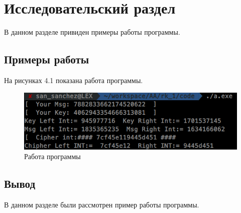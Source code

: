 \chapter{Исследовательский раздел}
\label{cha:research}

В данном разделе привиден примеры работы программы.

\section{Примеры работы}

На рисунках 4.1 показана работа программы.

\begin{figure}[H]
\centering
\includegraphics[scale=0.75]{./pict/example.png}
\caption{Работа программы}
\end{figure}
\section{Вывод}

В данном разделе были рассмотрен пример работы программы.
